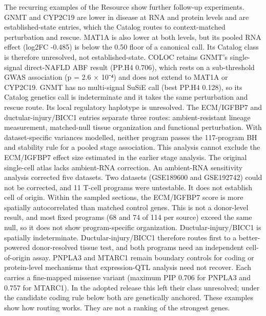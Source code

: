 

The recurring examples of the Resource show further follow-up experiments. GNMT
and CYP2C19 are lower in disease at RNA and protein levels and are
established-state entries, which the Catalog routes to context-matched
perturbation and rescue. MAT1A is also lower at both levels, but its pooled RNA
effect (log2FC -0.485) is below the 0.50 floor of a canonical call. Its Catalog
class is therefore unresolved, not established-state. COLOC retains GNMT's single-signal direct-NAFLD ABF result (PP.H4 0.706), which rests on a sub-threshold GWAS association (p = 2.6 × 10⁻⁴) and does not extend to MAT1A or CYP2C19. GNMT has no multi-signal SuSiE call (best PP.H4 0.128), so its
Catalog genetics call is indeterminate and it takes the same perturbation and
rescue route. Its local regulatory haplotype is unresolved. The ECM/IGFBP7 and
ductular-injury/BICC1 entries separate three routes: ambient-resistant lineage
measurement, matched-null tissue organization and functional perturbation. With
dataset-specific variances modelled, neither program passes the 117-program BH
and stability rule for a pooled stage association. This analysis cannot exclude
the ECM/IGFBP7 effect size estimated in the earlier stage analysis. The original
single-cell atlas lacks ambient-RNA correction. An ambient-RNA sensitivity
analysis corrected five datasets. Two datasets (GSE189600 and GSE192742) could
not be corrected, and 11 T-cell programs were untestable. It does not establish cell of origin.
Within the sampled sections, the ECM/IGFBP7 score is more spatially
autocorrelated than matched control genes. This is not a donor-level result,
and most fixed programs (68 and 74 of 114 per source) exceed the same null, so
it does not show program-specific organization. Ductular-injury/BICC1 is
spatially indeterminate. Ductular-injury/BICC1 therefore routes first to a better-powered
donor-resolved tissue test, and both programs need an independent cell-of-origin
assay. PNPLA3 and MTARC1 remain boundary controls for coding or protein-level
mechanisms that expression-QTL analysis need not recover. Each carries a
fine-mapped missense variant (maximum PIP 0.706 for PNPLA3 and 0.757 for
MTARC1). In the adopted release this left their class unresolved; under the candidate coding rule below both are genetically anchored. These examples
show how routing works. They are not a ranking of the strongest genes.

